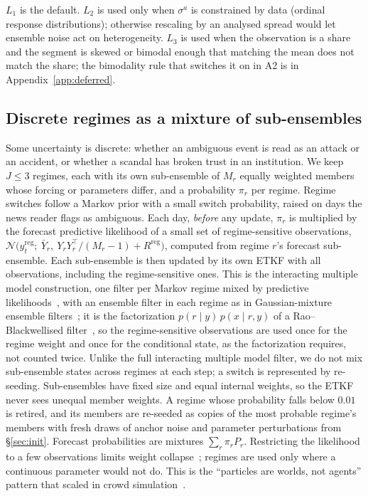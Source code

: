 \documentclass[10pt]{article}
\theoremstyle{remark}
\begin{document}
$L_1$ is the default. $L_2$ is used only when $\sigma^a$ is constrained by data (ordinal response distributions); otherwise rescaling by an analysed spread would let ensemble noise act on heterogeneity. $L_3$ is used when the observation is a share and the segment is skewed or bimodal enough that matching the mean does not match the share; the bimodality rule that switches it on in A2 is in Appendix~\ref{app:deferred}.

\subsection{Discrete regimes as a mixture of sub-ensembles}
\label{sec:pf}
Some uncertainty is discrete: whether an ambiguous event is read as an attack or an accident, or whether a scandal has broken trust in an institution. We keep $J\le3$ regimes, each with its own sub-ensemble of $M_r$ equally weighted members whose forcing or parameters differ, and a probability $\pi_r$ per regime. Regime switches follow a Markov prior with a small switch probability, raised on days the news reader flags as ambiguous. Each day, \emph{before} any update, $\pi_r$ is multiplied by the forecast predictive likelihood of a small set of regime-sensitive observations, $\mathcal{N}\big(y^{\mathrm{reg}}_t;\ \bar Y_r,\ Y_rY_r^\top/(M_r-1)+R^{\mathrm{reg}}\big)$, computed from regime $r$'s forecast sub-ensemble. Each sub-ensemble is then updated by its own ETKF with all observations, including the regime-sensitive ones. This is the interacting multiple model construction, one filter per Markov regime mixed by predictive likelihoods~\cite{blom1988}, with an ensemble filter in each regime as in Gaussian-mixture ensemble filters~\cite{stordal2011}; it is the factorization $p(r\mid y)\,p(x\mid r,y)$ of a Rao--Blackwellised filter~\cite{doucet2000}, so the regime-sensitive observations are used once for the regime weight and once for the conditional state, as the factorization requires, not counted twice. Unlike the full interacting multiple model filter, we do not mix sub-ensemble states across regimes at each step; a switch is represented by re-seeding. Sub-ensembles have fixed size and equal internal weights, so the ETKF never sees unequal member weights. A regime whose probability falls below $0.01$ is retired, and its members are re-seeded as copies of the most probable regime's members with fresh draws of anchor noise and parameter perturbations from \S\ref{sec:init}. Forecast probabilities are mixtures $\sum_r\pi_rP_r$. Restricting the likelihood to a few observations limits weight collapse~\cite{snyder2008}; regimes are used only where a continuous parameter would not do. This is the ``particles are worlds, not agents'' pattern that scaled in crowd simulation~\cite{makinoshima2022}.
\end{document}
